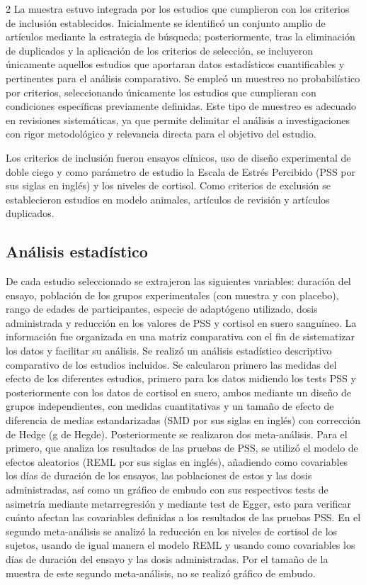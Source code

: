 \begin{multicols}{2}
La muestra estuvo integrada por los estudios que cumplieron con los criterios de inclusión establecidos. Inicialmente se identificó un conjunto amplio de artículos mediante la estrategia de búsqueda; posteriormente, tras la eliminación de duplicados y la aplicación de los criterios de selección, se incluyeron únicamente aquellos estudios que aportaran datos estadísticos cuantificables y pertinentes para el análisis comparativo. Se empleó un muestreo no probabilístico por criterios, seleccionando únicamente los estudios que cumplieran con condiciones específicas previamente definidas. Este tipo de muestreo es adecuado en revisiones sistemáticas, ya que permite delimitar el análisis a investigaciones con rigor metodológico y relevancia directa para el objetivo del estudio.

Los criterios de inclusión fueron ensayos clínicos, uso de diseño experimental de doble ciego y como parámetro de estudio la Escala de Estrés Percibido (PSS por sus siglas en inglés) y los niveles de cortisol. Como criterios de exclusión se establecieron estudios en modelo animales, artículos de revisión y artículos duplicados.

\subsection{Análisis estadístico}

De cada estudio seleccionado se extrajeron las siguientes variables: duración del ensayo, población de los grupos experimentales (con muestra y con placebo), rango de edades de participantes, especie de adaptógeno utilizado, dosis administrada y reducción en los valores de PSS y cortisol en suero sanguíneo. La información fue organizada en una matriz comparativa con el fin de sistematizar los datos y facilitar su análisis.
Se realizó un análisis estadístico descriptivo comparativo de los estudios incluidos. Se calcularon primero las medidas del efecto de los diferentes estudios, primero para los datos midiendo los tests PSS y posteriormente con los datos de cortisol en suero, ambos mediante un diseño de grupos independientes, con medidas cuantitativas y un tamaño de efecto de diferencia de medias estandarizadas (SMD por sus siglas en inglés) con corrección de Hedge (g de Hegde). Posteriormente se realizaron dos meta-análisis. Para el primero, que analiza los resultados de las pruebas de PSS, se utilizó el modelo de efectos aleatorios (REML por sus siglas en inglés), añadiendo como covariables los días de duración de los ensayos, las poblaciones de estos y las dosis administradas, así como un gráfico de embudo con sus respectivos tests de asimetría mediante metarregresión y mediante test de Egger, esto para verificar cuánto afectan las covariables definidas a los resultados de las pruebas PSS. En el segundo meta-análisis se analizó la reducción en los niveles de cortisol de los sujetos, usando de igual manera el modelo REML y usando como covariables los días de duración del ensayo y las dosis administradas. Por el tamaño de la muestra de este segundo meta-análisis, no se realizó gráfico de embudo.


\end{multicols}
